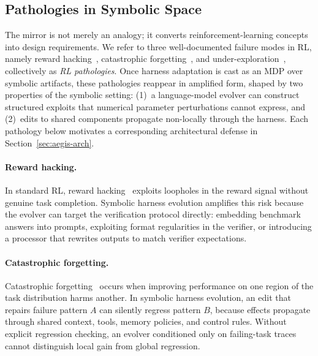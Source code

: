\subsection{Pathologies in Symbolic Space}
\label{sec:aegis-pathologies}

The mirror is not merely an analogy; it converts reinforcement-learning concepts into design requirements. We refer to three well-documented failure modes in RL, namely reward hacking~\cite{guo2025deepseek}, catastrophic forgetting~\cite{kirkpatrick2017overcoming}, and under-exploration~\cite{ladosz2022exploration}, collectively as \textit{RL pathologies}. Once harness adaptation is cast as an MDP over symbolic artifacts, these pathologies reappear in amplified form, shaped by two properties of the symbolic setting: (1)~a language-model evolver can construct structured exploits that numerical parameter perturbations cannot express, and (2)~edits to shared components propagate non-locally through the harness. Each pathology below motivates a corresponding architectural defense in Section~\ref{sec:aegis-arch}.


\paragraph{Reward hacking.}
In standard RL, reward hacking~\cite{guo2025deepseek} exploits loopholes in the reward signal without genuine task completion. Symbolic harness evolution amplifies this risk because the evolver can target the verification protocol directly: embedding benchmark answers into prompts, exploiting format regularities in the verifier, or introducing a processor that rewrites outputs to match verifier expectations.

\paragraph{Catastrophic forgetting.}
Catastrophic forgetting~\cite{kirkpatrick2017overcoming} occurs when improving performance on one region of the task distribution harms another. In symbolic harness evolution, an edit that repairs failure pattern $A$ can silently regress pattern $B$, because effects propagate through shared context, tools, memory policies, and control rules. Without explicit regression checking, an evolver conditioned only on failing-task traces cannot distinguish local gain from global regression.


